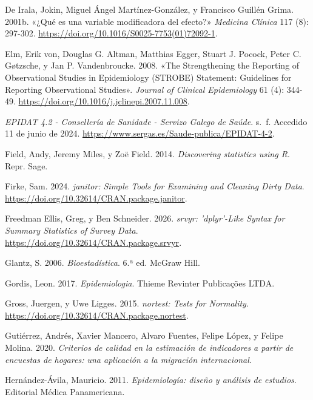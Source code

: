 \documentclass[
  spanish,
  a4paper,
]{scrbook}
\newlength{\cslhangindent}
\newenvironment{CSLReferences}[2] %
 {\begin{list}{}{%
  \setlength{\itemindent}{0pt}
  \setlength{\leftmargin}{0pt}
  \setlength{\parsep}{0pt}
  \ifodd #1
   \setlength{\leftmargin}{\cslhangindent}
   \setlength{\itemindent}{-1\cslhangindent}
  \fi
  \setlength{\itemsep}{#2\baselineskip}}}
 {\end{list}}
\begin{document}
\begin{CSLReferences}{1}{1}
De Irala, Jokin, Miguel Ángel Martínez-González, y Francisco Guillén
Grima. 2001b. {«¿{Qué} es una variable modificadora del efecto?»}
\emph{Medicina Clínica} 117 (8): 297-302.
\url{https://doi.org/10.1016/S0025-7753(01)72092-1}.

Elm, Erik von, Douglas G. Altman, Matthias Egger, Stuart J. Pocock,
Peter C. Gøtzsche, y Jan P. Vandenbroucke. 2008. {«The Strengthening the
Reporting of Observational Studies in Epidemiology (STROBE) Statement:
Guidelines for Reporting Observational Studies»}. \emph{Journal of
Clinical Epidemiology} 61 (4): 344-49.
\url{https://doi.org/10.1016/j.jclinepi.2007.11.008}.

\emph{{EPIDAT} 4.2 - {Consellería} de {Sanidade} - {Servizo} {Galego} de
{Saúde}}. s.~f. Accedido 11 de junio de 2024.
\url{https://www.sergas.es/Saude-publica/EPIDAT-4-2}.

Field, Andy, Jeremy Miles, y Zoë Field. 2014. \emph{Discovering
statistics using {R}}. Repr. Sage.

Firke, Sam. 2024. \emph{janitor: Simple Tools for Examining and Cleaning
Dirty Data}. \url{https://doi.org/10.32614/CRAN.package.janitor}.

Freedman Ellis, Greg, y Ben Schneider. 2026. \emph{srvyr: 'dplyr'-Like
Syntax for Summary Statistics of Survey Data}.
\url{https://doi.org/10.32614/CRAN.package.srvyr}.

Glantz, S. 2006. \emph{Bioestadística}. 6.ª ed. McGraw Hill.

Gordis, Leon. 2017. \emph{Epidemiologia}. Thieme Revinter Publicações
LTDA.

Gross, Juergen, y Uwe Ligges. 2015. \emph{nortest: Tests for Normality}.
\url{https://doi.org/10.32614/CRAN.package.nortest}.

Gutiérrez, Andrés, Xavier Mancero, Alvaro Fuentes, Felipe López, y
Felipe Molina. 2020. \emph{Criterios de calidad en la estimación de
indicadores a partir de encuestas de hogares: una aplicación a la
migración internacional}.

Hernández-Ávila, Mauricio. 2011. \emph{Epidemiología: diseño y análisis
de estudios}. Editorial Médica Panamericana.


\end{CSLReferences}
\end{document}
